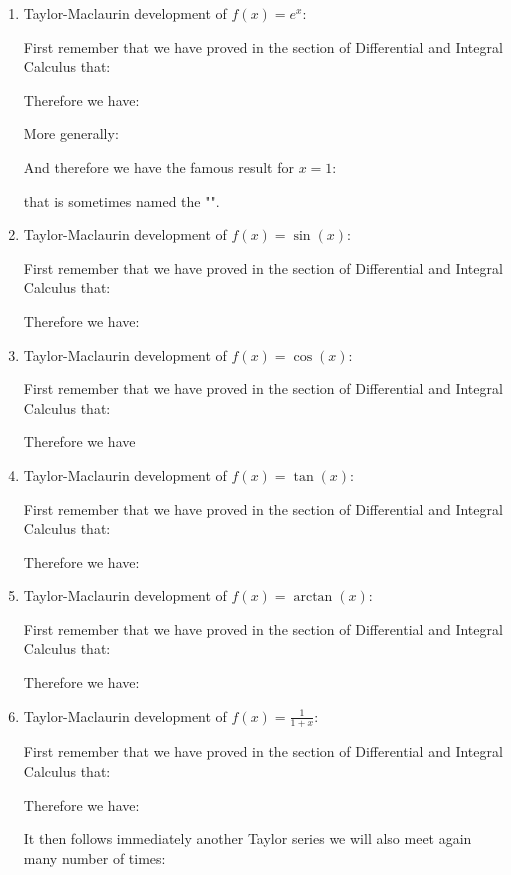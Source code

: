 	\begin{enumerate}
		\item Taylor-Maclaurin development of $f(x)=e^x$:
		
		First remember that we have proved in the section of Differential and Integral Calculus that:
		
		Therefore we have:
		
		More generally:
		
		And therefore we have the famous result for $x=1$\label{euler maclaurin expansion}:
		
		that is sometimes named the "".
		
		\item  Taylor-Maclaurin development of $f(x)=\sin(x)$:
		
		First remember that we have proved in the section of Differential and Integral Calculus that:
		
		Therefore we have:
		
		
		\item  Taylor-Maclaurin development of $f(x)=\cos(x)$:
		
		First remember that we have proved in the section of Differential and Integral Calculus that:
		
		Therefore we have\label{cosine maclaurin dev}
		
		\item  Taylor-Maclaurin development of $f(x)=\tan(x)$:
		
		First remember that we have proved in the section of Differential and Integral Calculus that:
		
		Therefore we have:
		
		
		\item  Taylor-Maclaurin development of $f(x)=\arctan(x)$:
		
		First remember that we have proved in the section of Differential and Integral Calculus that:
		
		Therefore we have:
		
		
		\item  Taylor-Maclaurin development of $f(x)=\displaystyle\frac{1}{1+x}$:
		
		First remember that we have proved in the section of Differential and Integral Calculus that:
		
		Therefore we have:
		
		It then follows immediately another Taylor series we will also meet again many  number of times:
		

\end{enumerate}
